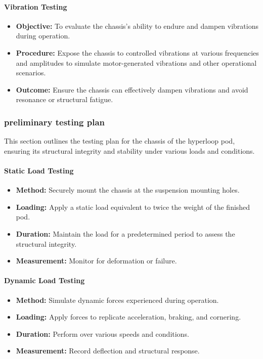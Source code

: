 \paragraph{Vibration Testing}
\begin{itemize}
    \item \textbf{Objective:} To evaluate the chassis's ability to endure and dampen vibrations during operation.
    \item \textbf{Procedure:} Expose the chassis to controlled vibrations at various frequencies and amplitudes to simulate motor-generated vibrations and other operational scenarios.
    \item \textbf{Outcome:} Ensure the chassis can effectively dampen vibrations and avoid resonance or structural fatigue.
\end{itemize}

\subsubsection{preliminary testing plan}

This section outlines the testing plan for the chassis of the hyperloop pod, ensuring its structural integrity and stability under various loads and conditions.

\paragraph{Static Load Testing}
\begin{itemize}
    \item \textbf{Method:} Securely mount the chassis at the suspension mounting holes.
    \item \textbf{Loading:} Apply a static load equivalent to twice the weight of the finished pod.
    \item \textbf{Duration:} Maintain the load for a predetermined period to assess the structural integrity.
    \item \textbf{Measurement:} Monitor for deformation or failure.
\end{itemize}

\paragraph{Dynamic Load Testing}
\begin{itemize}
    \item \textbf{Method:} Simulate dynamic forces experienced during operation.
    \item \textbf{Loading:} Apply forces to replicate acceleration, braking, and cornering.
    \item \textbf{Duration:} Perform over various speeds and conditions.
    \item \textbf{Measurement:} Record deflection and structural response.
\end{itemize}

